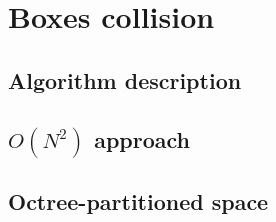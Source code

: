 \chapter{Boxes collision}
\label{cha:boxescollision}

\section{Algorithm description}
\label{sec:boxesalgorithmdescription}

\section{{$O(N^2)$} approach}
\label{sec:boxesinitial}

\section{Octree-partitioned space}
\label{sec:boxesoctree}

